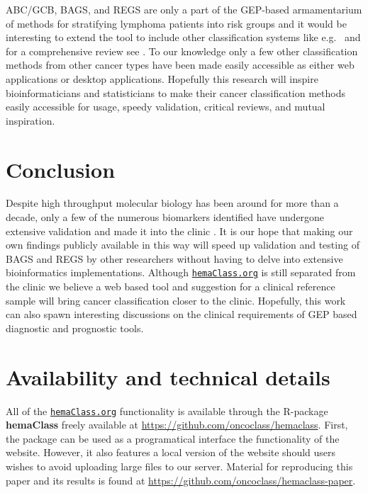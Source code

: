 \documentclass{article}
\newcommand{\hemaClass}{\href{http://hemaClass.org}{\texttt{hemaClass.org}}}
\newcommand{\R}{\textsf{R}}
\begin{document}
ABC/GCB, BAGS, and REGS are only a part of the GEP-based armamentarium of methods for stratifying lymphoma patients into risk groups and it would be interesting to extend the tool to include other classification systems like e.g.\ \citep{Shipp2002, Lossos2004a, Malumbres2008} and for a comprehensive review see \citep{Coutinho2013}.
To our knowledge only a few other classification methods from other cancer types have been made easily accessible as either web applications or desktop applications.
Hopefully this research will inspire bioinformaticians and statisticians to make their cancer classification methods easily accessible for usage, speedy validation, critical reviews, and mutual inspiration.

\section{Conclusion}
Despite high throughput molecular biology has been around for more than a decade, only a few of the numerous biomarkers identified have undergone extensive validation and made it into the clinic \citep{Chen2012a}.
It is our hope that making our own findings publicly available in this way will speed up validation and testing of BAGS and REGS by other researchers without having to delve into extensive bioinformatics implementations.
Although \hemaClass{} is still separated from the clinic we believe a web based tool and suggestion for a clinical reference sample will bring cancer classification closer to the clinic.
Hopefully, this work can also spawn interesting discussions on the clinical requirements of GEP based diagnostic and prognostic tools.

{}
\section*{Availability and technical details}
All of the \hemaClass{} functionality is available through the \R{}-package \textbf{hemaClass} freely available at
\url{https://github.com/oncoclass/hemaclass}.
First, the package can be used as a programatical interface the functionality of the website.
However, it also features a local version of the website should users wishes to avoid uploading large files to our server.
Material for reproducing this paper and its results is found at \url{https://github.com/oncoclass/hemaclass-paper}.
\end{document}
